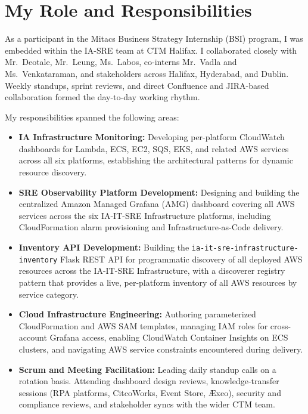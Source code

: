 \FloatBarrier

\section{My Role and Responsibilities}
\label{sec:my_role}


As a participant in the Mitacs Business Strategy Internship (BSI) program, I was embedded
within the IA-SRE team at CTM Halifax. I collaborated closely with Mr.\ Deotale, Mr.\ Leung,
Ms.\ Labos, co-interns Mr.\ Vadla and Ms.\ Venkataraman, and stakeholders across Halifax, Hyderabad, and
Dublin. Weekly standups, sprint reviews, and direct Confluence and JIRA-based
collaboration formed the day-to-day working rhythm.

My responsibilities spanned the following areas:

\begin{itemize}
    \item \textbf{IA Infrastructure Monitoring:} Developing per-platform CloudWatch
          dashboards for Lambda, ECS, EC2, SQS, EKS, and related AWS services across
          all six platforms, establishing the architectural patterns for dynamic resource
          discovery.

    \item \textbf{SRE Observability Platform Development:} Designing and building the
          centralized Amazon Managed Grafana (AMG) dashboard covering all AWS services
          across the six IA-IT-SRE Infrastructure platforms, including CloudFormation
          alarm provisioning and Infrastructure-as-Code delivery.

    \item \textbf{Inventory API Development:} Building the
          \texttt{ia-it-sre-infrastructure-inventory} Flask REST API for programmatic
          discovery of all deployed AWS resources across the IA-IT-SRE Infrastructure,
          with a discoverer registry pattern that provides a live, per-platform inventory
          of all AWS resources by service category.

    \item \textbf{Cloud Infrastructure Engineering:} Authoring parameterized
          CloudFormation and AWS SAM templates, managing IAM roles for cross-account
          Grafana access, enabling CloudWatch Container Insights on ECS clusters, and
          navigating AWS service constraints encountered during delivery.

    \item \textbf{Scrum and Meeting Facilitation:} Leading daily standup calls on a
          rotation basis. Attending dashboard design reviews, knowledge-transfer
          sessions (RPA platforms, CitcoWorks, Event Store, \AE xeo), security
          and compliance reviews, and stakeholder syncs with the wider CTM team.


\end{itemize}
